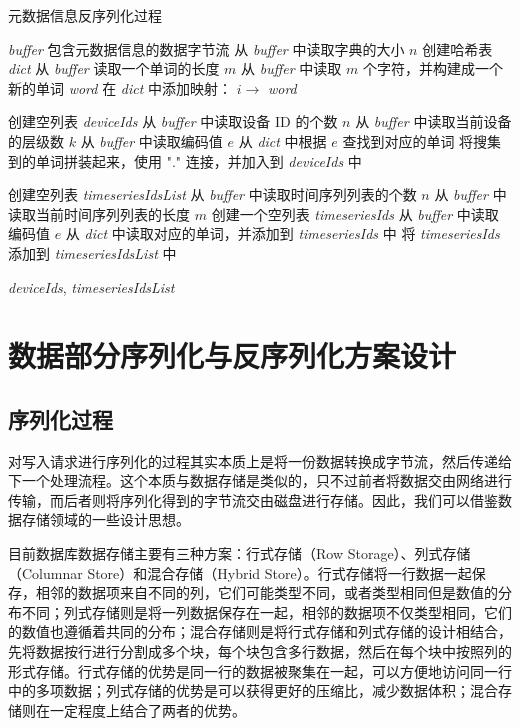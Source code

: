 \begin{algorithm}
  \caption{元数据信息反序列化过程}
  \label{alg:schema-decoding}
  \small
  \begin{algorithmic}
    \REQUIRE \emph{buffer} 包含元数据信息的数据字节流
    \STATE 从 \emph{buffer} 中读取字典的大小 $n$
    \STATE 创建哈希表 \emph{dict}
      \STATE 从 \emph{buffer} 读取一个单词的长度 $m$
      \STATE 从 \emph{buffer} 中读取 $m$ 个字符，并构建成一个新的单词 \emph{word}
      \STATE 在 \emph{dict} 中添加映射： $i \rightarrow $ \emph{word}
    \ENDFOR

    \STATE 创建空列表 \emph{deviceIds}
    \STATE 从 \emph{buffer} 中读取设备 ID 的个数 $n$
      \STATE 从 \emph{buffer} 中读取当前设备的层级数 $k$
        \STATE 从 \emph{buffer} 中读取编码值 $e$
        \STATE 从 \emph{dict} 中根据 $e$ 查找到对应的单词
      \ENDFOR
      \STATE 将搜集到的单词拼装起来，使用 "." 连接，并加入到 \emph{deviceIds} 中
    \ENDFOR

    \STATE 创建空列表 \emph{timeseriesIdsList}
    \STATE 从 \emph{buffer} 中读取时间序列列表的个数 $n$
      \STATE 从 \emph{buffer} 中读取当前时间序列列表的长度 $m$
      \STATE 创建一个空列表 \emph{timeseriesIds}
        \STATE 从 \emph{buffer} 中读取编码值 $e$
        \STATE 从 \emph{dict} 中读取对应的单词，并添加到 \emph{timeseriesIds} 中
      \ENDFOR
      \STATE 将 \emph{timeseriesIds} 添加到 \emph{timeseriesIdsList} 中
    \ENDFOR

    \RETURN \emph{deviceIds}, \emph{timeseriesIdsList}

  \end{algorithmic}
\end{algorithm}


\section{数据部分序列化与反序列化方案设计}
\subsection{序列化过程}
对写入请求进行序列化的过程其实本质上是将一份数据转换成字节流，然后传递给下一个处理流程。这个本质与数据存储是类似的，只不过前者将数据交由网络进行传输，而后者则将序列化得到的字节流交由磁盘进行存储。因此，我们可以借鉴数据存储领域的一些设计思想。

目前数据库数据存储主要有三种方案：行式存储（Row Storage）、列式存储（Columnar Store）和混合存储（Hybrid Store）。行式存储将一行数据一起保存，相邻的数据项来自不同的列，它们可能类型不同，或者类型相同但是数值的分布不同；列式存储则是将一列数据保存在一起，相邻的数据项不仅类型相同，它们的数值也遵循着共同的分布；混合存储则是将行式存储和列式存储的设计相结合，先将数据按行进行分割成多个块，每个块包含多行数据，然后在每个块中按照列的形式存储。行式存储的优势是同一行的数据被聚集在一起，可以方便地访问同一行中的多项数据；列式存储的优势是可以获得更好的压缩比，减少数据体积；混合存储则在一定程度上结合了两者的优势。

